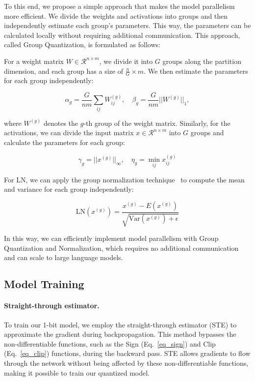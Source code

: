 To this end, we propose a simple approach that makes the model parallelism more efficient. We divide the weights and activations into groups and then independently estimate each group's parameters. This way, the parameters can be calculated locally without requiring additional communication. This approach, called Group Quantization, is formulated as follows:

For a weight matrix $W \in \mathcal{R}^{n \times m}$, we divide it into $G$ groups along the partition dimension, and each group has a size of $\frac{n}{G} \times m$. We then estimate the parameters for each group independently:

\begin{equation}
\alpha_g = \frac{G}{nm}\sum_{ij} W_{ij}^{(g)}, \quad \beta_g = \frac{G}{nm}||W^{(g)}||_1,
\end{equation}

where $W^{(g)}$ denotes the $g$-th group of the weight matrix. Similarly, for the activations, we can divide the input matrix $x \in \mathcal{R}^{n \times m}$ into $G$ groups and calculate the parameters for each group:

\begin{equation}
\gamma_g = ||x^{(g)}||_{\infty}, \quad \eta_g = \min_{ij} x_{ij}^{(g)}
\end{equation}

For LN, we can apply the group normalization technique~\cite{groupnorm} to compute the mean and variance for each group independently:

\begin{equation}
\mathrm{LN}(x^{(g)}) = \frac{x^{(g)}-E(x^{(g)})}{\sqrt{\mathrm{Var}(x^{(g)})+\epsilon}}
\end{equation}

In this way, we can efficiently implement model parallelism with Group Quantization and Normalization, which requires no additional communication and can scale to large language models.

\subsection{Model Training}

\paragraph{Straight-through estimator.}

To train our 1-bit model, we employ the straight-through estimator (STE)\cite{ste} to approximate the gradient during backpropagation. This method bypasses the non-differentiable functions, such as the Sign (Eq.~\ref{eq_sign}) and Clip (Eq.~\ref{eq_clip}) functions, during the backward pass. STE allows gradients to flow through the network without being affected by these non-differentiable functions, making it possible to train our quantized model. 

